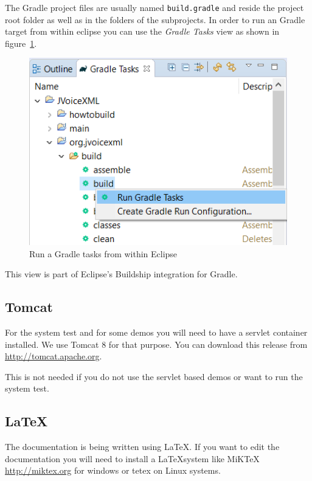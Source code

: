 \documentclass[11pt,a4paper]{article}
\begin{document}
The Gradle project files are usually named \texttt{build.gradle} and reside the 
project root folder as well as in the folders of the subprojects. 
In order to run an Gradle target from within
eclipse you can use the \emph{Gradle Tasks} view as shown in
figure~\ref{fig:eclipse-run-gradle}.
\begin{figure}
\includegraphics[width=\linewidth]{eclipse-run-gradle}
\caption{Run a Gradle tasks from within Eclipse}
\label{fig:eclipse-run-gradle}
\end{figure}

This view is part of Eclipse's Buildship integration for Gradle.

\subsection{Tomcat}
\label{sec:tomcat}

For the system test and for some demos you will need to have a servlet
container installed. We use Tomcat 8 for that purpose. You can download this
release from \url{http://tomcat.apache.org}.

This is not needed if you do not use the servlet based demos or want to run the
system test.

\subsection{\LaTeX}

The documentation is being written using \LaTeX. If you want to edit the
documentation you will need to install a \LaTeX system like MiKTeX
\url{http://miktex.org} for windows or tetex on Linux systems.
\end{document}
